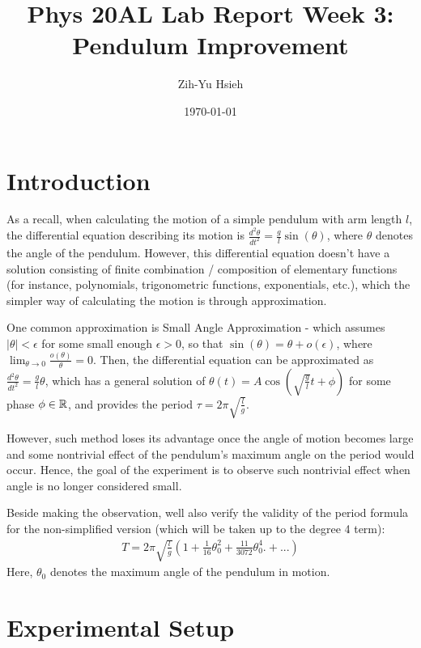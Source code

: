 \documentclass{article}
\title{Phys 20AL Lab Report Week 3: Pendulum Improvement}
\author{Zih-Yu Hsieh}
\date{\today}
\begin{document}
\maketitle

\tableofcontents

\newpage

\section{Introduction}
As a recall, when calculating the motion of a simple pendulum with arm length $l$, the differential equation describing its motion is $\frac{d^2\theta}{dt^2}=\frac{g}{l}\sin(\theta)$, where $\theta$ denotes the angle of the pendulum. However, this differential equation doesn't have a solution consisting of finite combination / composition of elementary functions (for instance, polynomials, trigonometric functions, exponentials, etc.), which the simpler way of calculating the motion is through approximation.

One common approximation is Small Angle Approximation - which assumes $|\theta|<\epsilon$ for some small enough $\epsilon>0$, so that $\sin(\theta) = \theta+o(\epsilon)$, where $\lim_{\theta\rightarrow 0}\frac{o(\theta)}{\theta}=0$. Then, the differential equation can be approximated as $\frac{d^2\theta}{dt^2}= \frac{g}{l}\theta$, which has a general solution of $\theta(t)=A\cos(\sqrt{\frac{g}{l}}t+\phi)$ for some phase $\phi\in\mathbb{R}$, and provides the period $\tau = 2\pi\sqrt{\frac{l}{g}}$.

However, such method loses its advantage once the angle of motion becomes large and some nontrivial effect of the pendulum's maximum angle on the period would occur. Hence, the goal of the experiment is to observe such nontrivial effect when angle is no longer considered small.

Beside making the observation, well also verify the validity of the period formula for the non-simplified version (which will be taken up to the degree 4 term):
\begin{align}
    T =2\pi\sqrt{\frac{l}{g}}\left(1+\frac{1}{16}\theta_0^2 + \frac{11}{3072}\theta_0^4.+ ...\right)
\end{align}\label{eq:nontriv}
Here, $\theta_0$ denotes the maximum angle of the pendulum in motion.

\hfil

\section{Experimental Setup}
\end{document}
